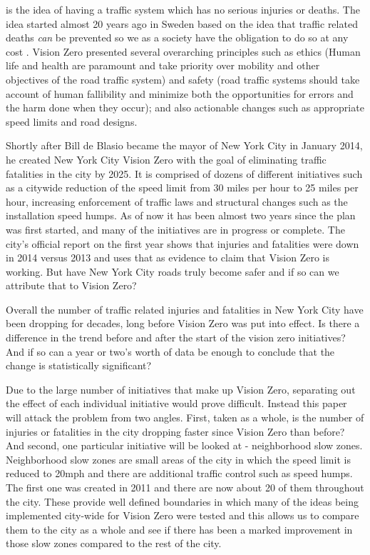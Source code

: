 \documentclass[10pt,journal,compsoc]{IEEEtran}
\begin{document}

 is the idea of having a traffic system which has no serious injuries or deaths.  The idea started almost 20 years ago in Sweden based on the idea that traffic related deaths \textit{can} be prevented so we as a society have the obligation to do so at any cost \cite{tingvall2000vision}.  Vision Zero presented several overarching principles such as ethics (Human life and health are paramount and take priority over mobility and other objectives of the road traffic system) and safety (road traffic systems should take account of human fallibility and minimize both the opportunities for errors and the harm done when they occur); and also actionable changes such as appropriate speed limits and road designs.

Shortly after Bill de Blasio became the mayor of New York City in January 2014, he created New York City Vision Zero with the goal of eliminating traffic fatalities in the city by 2025.  It is comprised of dozens of different initiatives such as a citywide reduction of the speed limit from 30 miles per hour to 25 miles per hour, increasing enforcement of traffic laws and structural changes such as the installation speed humps.  As of now it has been almost two years since the plan was first started, and many of the initiatives are in progress or complete.  The city's official report on the first year shows that injuries and fatalities were down in 2014 versus 2013 and uses that as evidence to claim that Vision Zero is working\cite{vzreport}.  But have New York City roads truly become safer and if so can we attribute that to Vision Zero?

Overall the number of traffic related injuries and fatalities in New York City have been dropping for decades, long before Vision Zero was put into effect.  Is there a difference in the trend before and after the start of the vision zero initiatives?  And if so can a year or two's worth of data be enough to conclude that the change is statistically significant?

Due to the large number of initiatives that make up Vision Zero, separating out the effect of each individual initiative would prove difficult.  Instead this paper will attack the problem from two angles.  First, taken as a whole, is the number of injuries or fatalities in the city dropping faster since Vision Zero than before?  And second, one particular initiative will be looked at - neighborhood slow zones.  Neighborhood slow zones are small areas of the city in which the speed limit is reduced to 20mph and there are additional traffic control such as speed humps.  The first one was created in 2011 and there are now about 20 of them throughout the city.  These provide well defined boundaries in which many of the ideas being implemented city-wide for Vision Zero were tested and this allows us to compare them to the city as a whole and see if there has been a marked improvement in those slow zones compared to the rest of the city.
\end{document}
